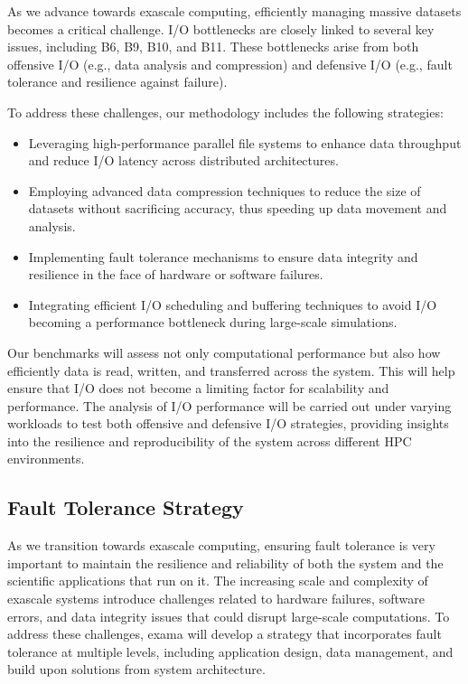 As we advance towards exascale computing, efficiently managing massive datasets becomes a critical challenge. I/O bottlenecks are closely linked to several key issues, including \ac{B6}, \ac{B9}, \ac{B10}, and \ac{B11}. 
These bottlenecks arise from both offensive I/O (e.g., data analysis and compression) and defensive I/O (e.g., fault tolerance and resilience against failure).

To address these challenges, our methodology includes the following strategies:
\begin{itemize}
    \item Leveraging high-performance parallel file systems to enhance data throughput and reduce I/O latency across distributed architectures.
    \item Employing advanced data compression techniques to reduce the size of datasets without sacrificing accuracy, thus speeding up data movement and analysis.
    \item Implementing fault tolerance mechanisms to ensure data integrity and resilience in the face of hardware or software failures.
    \item Integrating efficient I/O scheduling and buffering techniques to avoid I/O becoming a performance bottleneck during large-scale simulations.
\end{itemize}

Our benchmarks will assess not only computational performance but also how efficiently data is read, written, and transferred across the system. This will help ensure that I/O does not become a limiting factor for scalability and performance. The analysis of I/O performance will be carried out under varying workloads to test both offensive and defensive I/O strategies, providing insights into the resilience and reproducibility of the system across different HPC environments.

\subsection{Fault Tolerance Strategy}
\label{sec:fault-tolerance-strategy}

As we transition towards exascale computing, ensuring fault tolerance is very important to maintain the resilience and reliability of both the system and the scientific applications that run on it. The increasing scale and complexity of exascale systems introduce challenges related to hardware failures, software errors, and data integrity issues that could disrupt large-scale computations. To address these challenges, \ac{exama} will develop a  strategy that incorporates fault tolerance at multiple levels, including application design, data management, and build upon solutions from system architecture.

